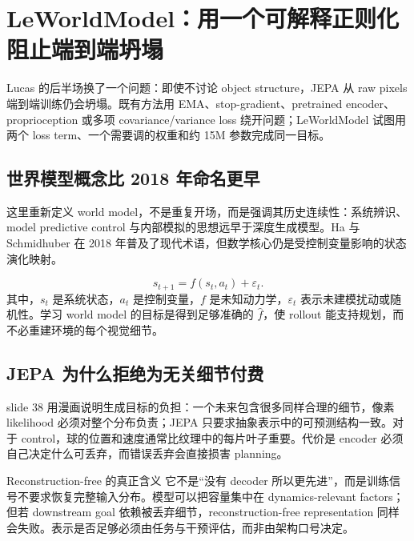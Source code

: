\section{LeWorldModel：用一个可解释正则化阻止端到端坍塌}

Lucas 的后半场换了一个问题：即使不讨论 object structure，JEPA 从 raw pixels 端到端训练仍会坍塌。既有方法用 EMA、stop-gradient、pretrained encoder、proprioception 或多项 covariance/variance loss 绕开问题；LeWorldModel 试图用两个 loss term、一个需要调的权重和约 15M 参数完成同一目标。

\subsection{世界模型概念比 2018 年命名更早}

这里重新定义 world model，不是重复开场，而是强调其历史连续性：系统辨识、model predictive control 与内部模拟的思想远早于深度生成模型。Ha 与 Schmidhuber 在 2018 年普及了现代术语，但数学核心仍是受控制变量影响的状态演化映射。


\[
s_{t+1}=f(s_t,a_t)+\varepsilon_t.
\]
其中，$s_t$ 是系统状态，$a_t$ 是控制变量，$f$ 是未知动力学，$\varepsilon_t$ 表示未建模扰动或随机性。学习 world model 的目标是得到足够准确的 $\hat f$，使 rollout 能支持规划，而不必重建环境的每个视觉细节。


\subsection{JEPA 为什么拒绝为无关细节付费}

slide 38 用漫画说明生成目标的负担：一个未来包含很多同样合理的细节，像素 likelihood 必须对整个分布负责；JEPA 只要求抽象表示中的可预测结构一致。对于 control，球的位置和速度通常比纹理中的每片叶子重要。代价是 encoder 必须自己决定什么可丢弃，而错误丢弃会直接损害 planning。


\begin{importantbox}{Reconstruction-free 的真正含义}
它不是``没有 decoder 所以更先进''，而是训练信号不要求恢复完整输入分布。模型可以把容量集中在 dynamics-relevant factors；但若 downstream goal 依赖被丢弃细节，reconstruction-free representation 同样会失败。表示是否足够必须由任务与干预评估，而非由架构口号决定。
\end{importantbox}

